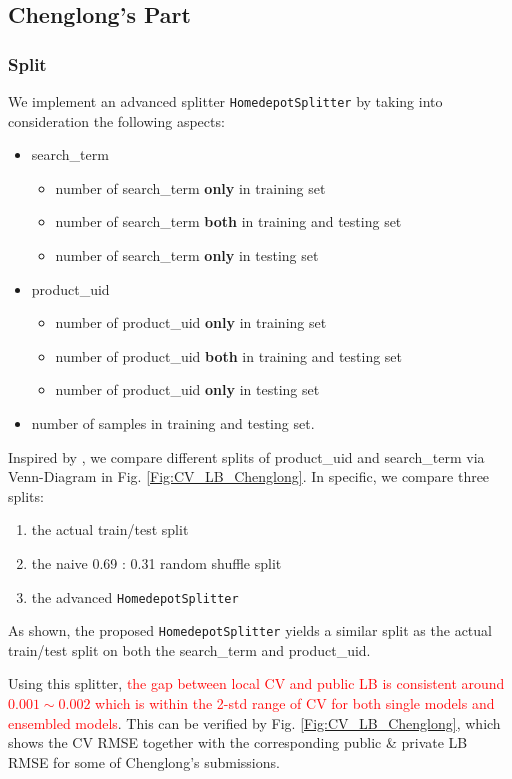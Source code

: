 \documentclass[12pt]{article}
\begin{document}
{{\subsection{Chenglong's Part}
\subsubsection{Split}
We implement an advanced splitter \texttt{HomedepotSplitter} by taking into consideration the following aspects:
\begin{itemize}
\item search\_term
\begin{itemize}
\item number of search\_term \textbf{only} in training set
\item number of search\_term \textbf{both} in training and testing set
\item number of search\_term \textbf{only} in testing set
\end{itemize}
\item product\_uid
\begin{itemize}
\item number of product\_uid \textbf{only} in training set
\item number of product\_uid \textbf{both} in training and testing set
\item number of product\_uid \textbf{only} in testing set
\end{itemize}
\item number of samples in training and testing set.
\end{itemize}

Inspired by \cite{BenS}, we compare different splits of product\_uid and search\_term via Venn-Diagram in Fig. \ref{Fig:CV_LB_Chenglong}. In specific, we compare three splits:
\begin{enumerate}
\item the actual train/test split
\item the naive 0.69 : 0.31 random shuffle split
\item the advanced \texttt{HomedepotSplitter}
\end{enumerate}
As shown, the proposed \texttt{HomedepotSplitter} yields a similar split as the actual train/test split on both the search\_term and product\_uid.

Using this splitter, \textcolor{red}{the gap between local CV and public LB is consistent around $0.001\sim 0.002$ which is within the 2-std range of CV for both single models and ensembled models}. This can be verified by Fig. \ref{Fig:CV_LB_Chenglong}, which shows the CV RMSE together with the corresponding public \& private LB RMSE for some of Chenglong's submissions.

}}
\end{document}
